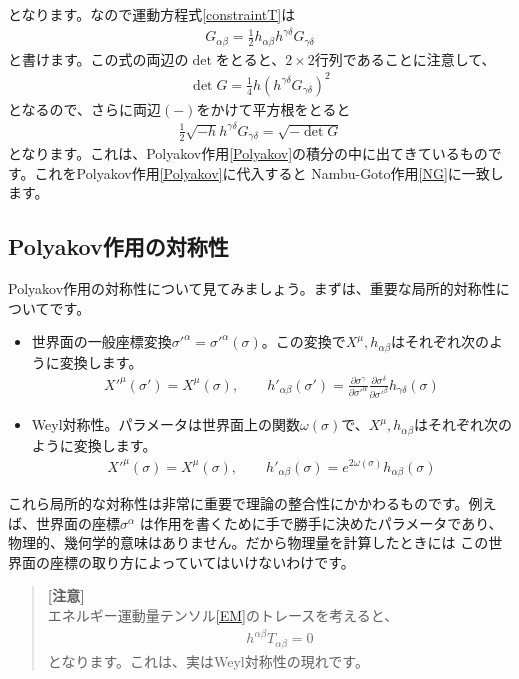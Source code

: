 \documentclass[report,paper=a4, fontsize=12pt, line_length=16cm, number_of_lines=34,dvipdfmx]{jlreq}
\numberwithin{equation}{chapter}
\numberwithin{equation}{section}
\newcommand{\del}{\partial}
\newcommand{\kyou}[1]{{\sffamily \bfseries #1}}
\newenvironment{remark}{\begin{quote}\small{\kyou{[注意]}}\\ }{\end{quote}}
\begin{document}
となります。なので運動方程式\eqref{constraintT}は
\begin{align}
G_{\alpha\beta}=\frac12 h_{\alpha\beta}h^{\gamma\delta}G_{\gamma\delta}
\end{align}
と書けます。この式の両辺の$\det$をとると、$2\times 2$行列であることに注意して、
\begin{align}
\det G=\frac14 h (h^{\gamma\delta}G_{\gamma\delta})^2
\end{align}
となるので、さらに両辺$(-)$をかけて平方根をとると
\begin{align}
\frac12 \sqrt{-h}h^{\gamma\delta}G_{\gamma\delta}=\sqrt{-\det G}
\end{align}
となります。これは、Polyakov作用\eqref{Polyakov}の積分の中に出てきているものです。これをPolyakov作用\eqref{Polyakov}に代入すると
Nambu-Goto作用\eqref{NG}に一致します。
\subsection{Polyakov作用の対称性}
Polyakov作用の対称性について見てみましょう。まずは、重要な局所的対称性についてです。
\begin{itemize}
\item 世界面の一般座標変換$\sigma'^{\alpha}=\sigma'^{\alpha}(\sigma)$。この変換で$X^{\mu},h_{\alpha\beta}$はそれぞれ次のように変換します。
\begin{align}
X'^\mu(\sigma')=X^{\mu}(\sigma),\qquad
h'_{\alpha\beta}(\sigma') = 
\frac{\del \sigma^{\gamma}}{\del \sigma'^{\alpha}}
\frac{\del \sigma^{\delta}}{\del \sigma'^{\beta}}
h_{\gamma\delta}(\sigma)
\end{align}
\item Weyl対称性。パラメータは世界面上の関数$\omega(\sigma)$で、$X^{\mu},h_{\alpha\beta}$はそれぞれ次のように変換します。
\begin{align}
X'^\mu(\sigma)=X^{\mu}(\sigma),\qquad
h'_{\alpha\beta}(\sigma) =
e^{2\omega(\sigma)}
h_{\alpha\beta}(\sigma)
\end{align}
\end{itemize}
これら局所的な対称性は非常に重要で理論の整合性にかかわるものです。例えば、世界面の座標$\sigma^{\alpha}$
は作用を書くために手で勝手に決めたパラメータであり、物理的、幾何学的意味はありません。だから物理量を計算したときには
この世界面の座標の取り方によっていてはいけないわけです。
\begin{remark}
エネルギー運動量テンソル\eqref{EM}のトレースを考えると、
\begin{align}
h^{\alpha\beta}T_{\alpha\beta}=0
\end{align}
となります。これは、実はWeyl対称性の現れです。
\end{remark}
\end{document}
